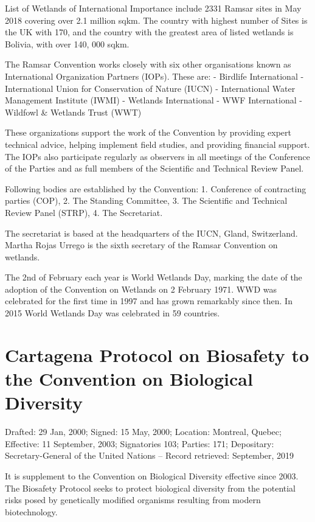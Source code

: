 \documentclass[]{book}
\begin{document}
List of Wetlands of International Importance include 2331 Ramsar sites in May 2018 covering over 2.1 million sqkm. The country with highest number of Sites is the UK with 170, and the country with the greatest area of listed wetlands is Bolivia, with over 140, 000 sqkm.

The Ramsar Convention works closely with six other organisations known as International Organization Partners (IOPs). These are:
- Birdlife International
- International Union for Conservation of Nature (IUCN)
- International Water Management Institute (IWMI)
- Wetlands International
- WWF International
- Wildfowl \& Wetlands Trust (WWT)

These organizations support the work of the Convention by providing expert technical advice, helping implement field studies, and providing financial support. The IOPs also participate regularly as observers in all meetings of the Conference of the Parties and as full members of the Scientific and Technical Review Panel.

Following bodies are established by the Convention: 1. Conference of contracting parties (COP), 2. The Standing Committee, 3. The Scientific and Technical Review Panel (STRP), 4. The Secretariat.

The secretariat is based at the headquarters of the IUCN, Gland, Switzerland. Martha Rojas Urrego is the sixth secretary of the Ramsar Convention on wetlands.

The 2nd of February each year is World Wetlands Day, marking the date of the adoption of the Convention on Wetlands on 2 February 1971. WWD was celebrated for the first time in 1997 and has grown remarkably since then. In 2015 World Wetlands Day was celebrated in 59 countries.

\hypertarget{cartagena-protocol-on-biosafety-to-the-convention-on-biological-diversity}{%
\section{Cartagena Protocol on Biosafety to the Convention on Biological Diversity}\label{cartagena-protocol-on-biosafety-to-the-convention-on-biological-diversity}}

Drafted: 29 Jan, 2000; Signed: 15 May, 2000; Location: Montreal, Quebec; Effective: 11 September, 2003; Signatories 103; Parties: 171; Depositary: Secretary-General of the United Nations -- Record retrieved: September, 2019

It is supplement to the Convention on Biological Diversity effective since 2003. The Biosafety Protocol seeks to protect biological diversity from the potential risks posed by genetically modified organisms resulting from modern biotechnology.
\end{document}
